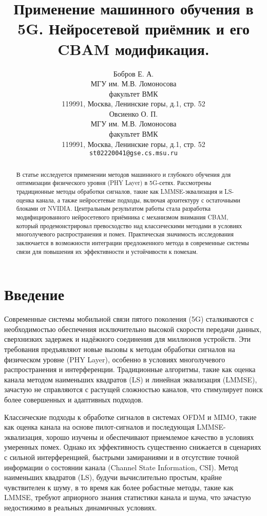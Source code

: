 \documentclass{article}
\title{Применение машинного обучения в 5G. Нейросетевой приёмник и его CBAM модификация.}
\author{Бобров Е. А.\\
	МГУ им. М.В. Ломоносова\\
	факультет ВМК\\
        119991, Москва, Ленинские горы, д.1, стр. 52\\
        \And
        Овсиенко О. П. \\
	МГУ им. М.В. Ломоносова\\
	факультет ВМК\\
        119991, Москва, Ленинские горы, д.1, стр. 52\\
	\texttt{st02220041@gse.cs.msu.ru} \\
}
\date{}
\begin{document}
\maketitle

\begin{abstract}
В статье исследуется применении методов машинного и глубокого обучения для оптимизации физического уровня (PHY Layer) в 5G-сетях. Рассмотрены традиционные методы обработки сигналов, такие как LMMSE-эквализация и LS-оценка канала, а также нейросетевые подходы, включая архитектуру с остаточными блоками от NVIDIA. Центральным результатом работы стала разработка модифицированного нейросетевого приёмника с механизмом внимания CBAM, который продемонстрировал превосходство над классическими методами в условиях многолучевого распространения и помех. Практическая значимость исследования заключается в возможности интеграции предложенного метода в современные системы связи для повышения их эффективности и устойчивости к помехам.
\end{abstract}


\section*{Введение}

Современные системы мобильной связи пятого поколения (5G) сталкиваются с необходимостью обеспечения исключительно высокой скорости передачи данных, сверхнизких задержек и надёжного соединения для миллионов устройств. Эти требования предъявляют новые вызовы к методам обработки сигналов на физическом уровне (PHY Layer), особенно в условиях многолучевого распространения и интерференции. Традиционные алгоритмы, такие как оценка канала методом наименьших квадратов (LS) и линейная эквализация (LMMSE), зачастую не справляются с растущей сложностью каналов, что стимулирует поиск более совершенных и адаптивных подходов.

Классические подходы к обработке сигналов в системах OFDM и MIMO, такие как оценка канала на основе пилот-сигналов и последующая LMMSE-эквализация, хорошо изучены и обеспечивают приемлемое качество в условиях умеренных помех. Однако их эффективность существенно снижается в сценариях с сильной интерференцией, быстрыми замираниями и в отсутствие точной информации о состоянии канала (Channel State Information, CSI). Метод наименьших квадратов (LS), будучи вычислительно простым, крайне чувствителен к шуму, в то время как более робастные методы, такие как LMMSE, требуют априорного знания статистики канала и шума, что зачастую недостижимо в реальных динамичных условиях.
\end{document}
